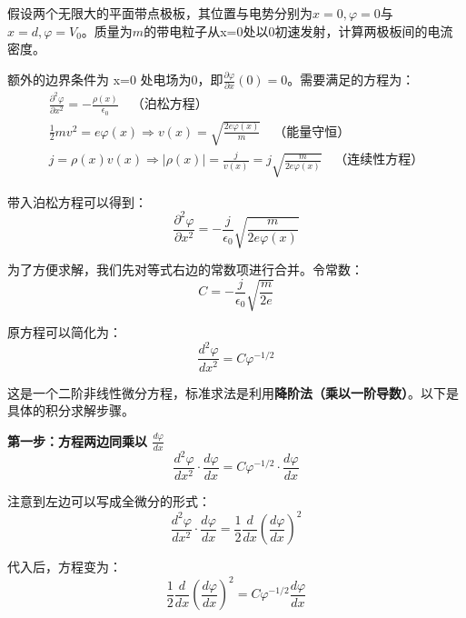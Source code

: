   假设两个无限大的平面带点极板，其位置与电势分别为$x = 0, \varphi = 0$与$x = d, \varphi = V_0$。质量为$m$的带电粒子从x=0处以0初速发射，计算两极板间的电流密度。

  额外的边界条件为 x=0 处电场为0，即$\frac{\partial \varphi}{\partial x}(0) = 0$。需要满足的方程为：
  \begin{gather}
    \frac{\partial^2 \varphi}{\partial x^2} = -\frac{\rho(x)}{\epsilon_0} \quad \text{（泊松方程）} \\
    \frac{1}{2} m v^2 = e \varphi(x) \Rightarrow v(x) = \sqrt{\frac{2e\varphi(x)}{m}} \quad \text{（能量守恒）} \\
    j = \rho(x) v(x) \Rightarrow |\rho(x)| = \frac{j}{v(x)} = j \sqrt{\frac{m}{2e\varphi(x)}} \quad \text{（连续性方程）}
  \end{gather}

  带入泊松方程可以得到：
  \begin{equation}
    \frac{\partial^2 \varphi}{\partial x^2} = -\frac{j}{\epsilon_0} \sqrt{\frac{m}{2e\varphi(x)}}
  \end{equation}

  为了方便求解，我们先对等式右边的常数项进行合并。令常数：
  \begin{equation}
    C = -\frac{j}{\epsilon_0} \sqrt{\frac{m}{2e}}
  \end{equation}

  原方程可以简化为：
  \begin{equation}
    \frac{d^2 \varphi}{d x^2} = C \varphi^{-1/2}
  \end{equation}

  这是一个二阶非线性微分方程，标准求法是利用\textbf{降阶法（乘以一阶导数）}。以下是具体的积分求解步骤。

  \medskip
  \textbf{第一步：方程两边同乘以 $\displaystyle \frac{d\varphi}{dx}$}
  \begin{equation}
    \frac{d^2 \varphi}{d x^2} \cdot \frac{d\varphi}{dx} = C \varphi^{-1/2} \cdot \frac{d\varphi}{dx}
  \end{equation}

  注意到左边可以写成全微分的形式：
  \begin{equation}
    \frac{d^2 \varphi}{d x^2} \cdot \frac{d\varphi}{dx} = \frac{1}{2} \frac{d}{dx} \left( \frac{d\varphi}{dx} \right)^2
  \end{equation}

  代入后，方程变为：
  \begin{equation}
    \frac{1}{2} \frac{d}{dx} \left( \frac{d\varphi}{dx} \right)^2 = C \varphi^{-1/2} \frac{d\varphi}{dx}
  \end{equation}

